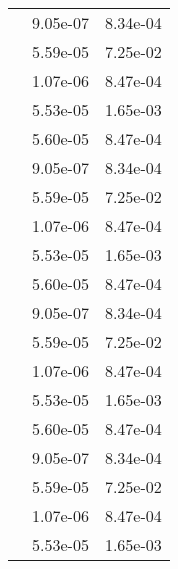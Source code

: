 \begin{table}
\begin{tabular}{c|cc|}
\multicolumn{1}{|c|}{} & \multicolumn{1}{|c|}{  9.05e-07} & \multicolumn{1}{|c|}{  8.34e-04} \\ 
\multicolumn{1}{|c|}{} & \multicolumn{1}{|c|}{  5.59e-05} & \multicolumn{1}{|c|}{  7.25e-02} \\ 
\multicolumn{1}{|c|}{} & \multicolumn{1}{|c|}{  1.07e-06} & \multicolumn{1}{|c|}{  8.47e-04} \\ 
\multicolumn{1}{|c|}{} & \multicolumn{1}{|c|}{  5.53e-05} & \multicolumn{1}{|c|}{  1.65e-03} \\ 
\multicolumn{1}{|c|}{} & \multicolumn{1}{|c|}{  5.60e-05} & \multicolumn{1}{|c|}{  8.47e-04} \\ 
\multicolumn{1}{|c|}{} & \multicolumn{1}{|c|}{  9.05e-07} & \multicolumn{1}{|c|}{  8.34e-04} \\ 
\multicolumn{1}{|c|}{} & \multicolumn{1}{|c|}{  5.59e-05} & \multicolumn{1}{|c|}{  7.25e-02} \\ 
\multicolumn{1}{|c|}{} & \multicolumn{1}{|c|}{  1.07e-06} & \multicolumn{1}{|c|}{  8.47e-04} \\ 
\multicolumn{1}{|c|}{} & \multicolumn{1}{|c|}{  5.53e-05} & \multicolumn{1}{|c|}{  1.65e-03} \\ 
\multicolumn{1}{|c|}{} & \multicolumn{1}{|c|}{  5.60e-05} & \multicolumn{1}{|c|}{  8.47e-04} \\ 
\multicolumn{1}{|c|}{} & \multicolumn{1}{|c|}{  9.05e-07} & \multicolumn{1}{|c|}{  8.34e-04} \\ 
\multicolumn{1}{|c|}{} & \multicolumn{1}{|c|}{  5.59e-05} & \multicolumn{1}{|c|}{  7.25e-02} \\ 
\multicolumn{1}{|c|}{} & \multicolumn{1}{|c|}{  1.07e-06} & \multicolumn{1}{|c|}{  8.47e-04} \\ 
\multicolumn{1}{|c|}{} & \multicolumn{1}{|c|}{  5.53e-05} & \multicolumn{1}{|c|}{  1.65e-03} \\ 
\multicolumn{1}{|c|}{} & \multicolumn{1}{|c|}{  5.60e-05} & \multicolumn{1}{|c|}{  8.47e-04} \\ 
\multicolumn{1}{|c|}{} & \multicolumn{1}{|c|}{  9.05e-07} & \multicolumn{1}{|c|}{  8.34e-04} \\ 
\multicolumn{1}{|c|}{} & \multicolumn{1}{|c|}{  5.59e-05} & \multicolumn{1}{|c|}{  7.25e-02} \\ 
\multicolumn{1}{|c|}{} & \multicolumn{1}{|c|}{  1.07e-06} & \multicolumn{1}{|c|}{  8.47e-04} \\ 
\multicolumn{1}{|c|}{} & \multicolumn{1}{|c|}{  5.53e-05} & \multicolumn{1}{|c|}{  1.65e-03} \\ 

\end{tabular}
\end{table}
